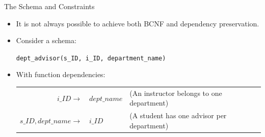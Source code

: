 \documentclass[aspectratio=169]{beamer}
\begin{document}

\begin{frame}{The Schema and Constraints}
    \begin{itemize}
        \item It is not always possible to achieve both BCNF and dependency preservation.
        \item Consider a schema:
            \begin{center}
                \texttt{dept\_advisor(s\_ID, i\_ID, department\_name)}
            \end{center}
        \item With function dependencies:\\
            \begin{tabular}{r l l}
                $i\_ID \rightarrow$ & $dept\_name$ & {\footnotesize (An instructor belongs to one department)} \\
                $s\_ID, dept\_name \rightarrow$ & $i\_ID$ & {\footnotesize (A student has one advisor per department)}
            \end{tabular}
    \end{itemize}
\end{frame}
\end{document}
